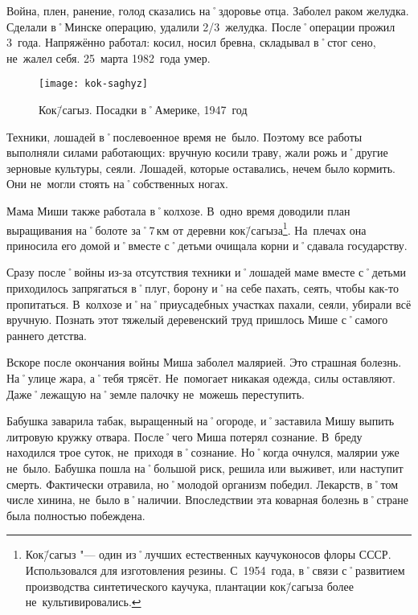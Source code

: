 Война, плен, ранение, голод сказались на˚здоровье отца. Заболел раком желудка. Сделали в˚Минске операцию, удалили 2/3~желудка. После˚операции прожил 3~года. Напряжённо работал: косил, носил бревна, складывал в˚стог сено, не~жалел себя. 25~марта 1982~года умер.

\begin{wrapfigure}{O}{.4\textwidth}
\centering
\texttt{[image: kok-saghyz]}
\caption[Кок\=/сагыз. Посадки в˚Америке, 1947~год]{Кок\=/сагыз. Посадки в˚Америке, 1947~год\footnotemark}
\label{fig:kok-saghyz}
\end{wrapfigure}

Техники, лошадей в˚послевоенное время не~было. Поэтому все работы выполняли силами работающих: вручную косили траву, жали рожь и˚другие зерновые культуры, сеяли. Лошадей, которые оставались, нечем было кормить. Они не~могли стоять на˚собственных ногах.

Мама Миши также работала в˚колхозе. В~одно время доводили план выращивания на˚болоте за˚7\,км от деревни кок\=/сагыза\footnote{Кок\=/сагыз "--- один из˚лучших естественных каучуконосов флоры СССР. Использовался для изготовления резины. С~1954~года, в˚связи с˚развитием производства синтетического каучука, плантации кок\=/сагыза более не~культивировались.}. На~плечах она приносила его домой и˚вместе с˚детьми очищала корни и˚сдавала государству.

Сразу после˚войны из-за отсутствия техники и˚лошадей маме вместе с˚детьми приходилось запрягаться в˚плуг, борону и˚на себе пахать, сеять, чтобы как-то пропитаться. В~колхозе и˚на˚приусадебных участках пахали, сеяли, убирали всё вручную. Познать этот тяжелый деревенский труд пришлось  Мише с˚самого раннего детства.

Вскоре после окончания войны Миша заболел малярией. Это страшная болезнь. На˚улице жара, а˚тебя трясёт. Не~помогает никакая одежда, силы оставляют. Даже˚лежащую на˚земле палочку не~можешь переступить. 

Бабушка заварила табак, выращенный на˚огороде, и˚заставила Мишу выпить литровую кружку отвара. После˚чего Миша потерял сознание. В~бреду находился трое суток, не~приходя в˚сознание. Но˚когда очнулся, малярии уже не~было. Бабушка пошла на˚большой риск, решила или выживет, или наступит смерть. Фактически отравила, но˚молодой организм победил. Лекарств, в˚том числе хинина, не~было в˚наличии. Впоследствии эта коварная болезнь в˚стране была полностью побеждена.

